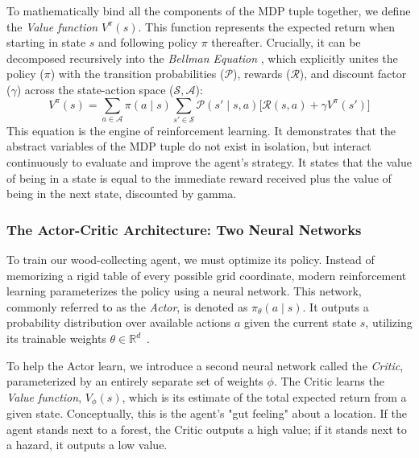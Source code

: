 To mathematically bind all the components of the MDP tuple together, we define the \emph{Value function} $V^\pi(s)$. This function represents the expected return when starting in state $s$ and following policy $\pi$ thereafter. Crucially, it can be decomposed recursively into the \emph{Bellman Equation} \parencite{bellman1957dynamic}, which explicitly unites the policy ($\pi$) with the transition probabilities ($\mathcal{P}$), rewards ($\mathcal{R}$), and discount factor ($\gamma$) across the state-action space ($\mathcal{S}, \mathcal{A}$):
\begin{equation}
    V^\pi(s) = \sum_{a \in \mathcal{A}} \pi(a \mid s) \sum_{s' \in \mathcal{S}} \mathcal{P}(s' \mid s, a) \Big[ \mathcal{R}(s, a) + \gamma V^\pi(s') \Big]
\label{eq:bellman}
\end{equation}
This equation is the engine of reinforcement learning. It demonstrates that the abstract variables of the MDP tuple do not exist in isolation, but interact continuously to evaluate and improve the agent's strategy. It states that the value of being in a state is equal to the immediate reward received plus the value of being in the next state, discounted by gamma. 

\subsubsection{The Actor-Critic Architecture: Two Neural Networks}
\label{subsec:actor_critic}

To train our wood-collecting agent, we must optimize its policy. Instead of memorizing a rigid table of every possible grid coordinate, modern reinforcement learning parameterizes the policy using a neural network. This network, commonly referred to as the \emph{Actor}, is denoted as $\pi_\theta(a \mid s)$. It outputs a probability distribution over available actions $a$ given the current state $s$, utilizing its trainable weights $\theta \in \mathbb{R}^d$~\parencite{Sutton_Barto_2018}.

To help the Actor learn, we introduce a second neural network called the \emph{Critic}, parameterized by an entirely separate set of weights $\phi$. The Critic learns the \emph{Value function}, $V_\phi(s)$, which is its estimate of the total expected return from a given state. Conceptually, this is the agent's "gut feeling" about a location. If the agent stands next to a forest, the Critic outputs a high value; if it stands next to a hazard, it outputs a low value.

